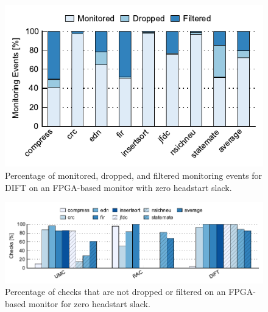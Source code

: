 \begin{figure}
  \begin{center}
    \includegraphics{monitoring_hard_drop/data/zero_slack_flex_dift.pdf}
    \caption{Percentage of monitored, dropped, and filtered monitoring events
    for DIFT on an FPGA-based monitor with zero headstart slack.}
    \label{fig:monitoring_hard_drop.evaluation.zero_slack_flex_dift}
  \end{center}
\end{figure}

\begin{figure}
  \begin{center}
    \includegraphics{monitoring_hard_drop/data/zero_slack_flex_coverage.pdf}
    \caption{Percentage of checks that are not dropped or filtered on an
    FPGA-based monitor for zero headstart slack.}
    \label{fig:monitoring_hard_drop.evaluation.zero_slack_flex_coverage}
  \end{center}
\end{figure}


